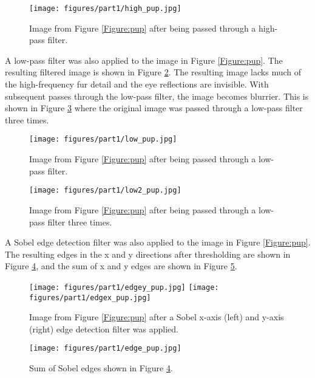 \documentclass{article}
\begin{document}
\begin{figure}[!ht]
  \centering
  \texttt{[image: figures/part1/high\_pup.jpg]}
  \caption{Image from Figure \ref{Figure:pup} after being passed through a high-pass filter. }
  \label{Figure:highpup}
\end{figure}

A low-pass filter was also applied to the image in Figure \ref{Figure:pup}. The resulting filtered image is shown in Figure \ref{Figure:lowpup}. The resulting image lacks much of the high-frequency fur detail and the eye reflections are invisible. With subsequent passes through the low-pass filter, the image becomes blurrier. This is shown in Figure \ref{Figure:low2pup} where the original image was passed through a low-pass filter three times.

\begin{figure}[!ht]
  \centering
  \texttt{[image: figures/part1/low\_pup.jpg]}
  \caption{Image from Figure \ref{Figure:pup} after being passed through a low-pass filter. }
  \label{Figure:lowpup}
\end{figure}

\begin{figure}[!ht]
  \centering
  \texttt{[image: figures/part1/low2\_pup.jpg]}
  \caption{Image from Figure \ref{Figure:pup} after being passed through a low-pass filter three times. }
  \label{Figure:low2pup}
\end{figure}

A Sobel edge detection filter was also applied to the image in Figure \ref{Figure:pup}. The resulting edges in the x and y directions after thresholding are shown in Figure \ref{Figure:edgeypup}, and the sum of x and y edges are shown in Figure \ref{Figure:edgepup}.

\begin{figure}[!ht]
  \centering
  \texttt{[image: figures/part1/edgey\_pup.jpg]}
  \texttt{[image: figures/part1/edgex\_pup.jpg]}
  \caption{Image from Figure \ref{Figure:pup} after a Sobel x-axis (left) and y-axis (right) edge detection filter was applied. }
  \label{Figure:edgeypup}
\end{figure}

\begin{figure}[!ht]
  \centering
  \texttt{[image: figures/part1/edge\_pup.jpg]}
  \caption{Sum of Sobel edges shown in Figure \ref{Figure:edgeypup}. }
  \label{Figure:edgepup}
\end{figure}
\end{document}
